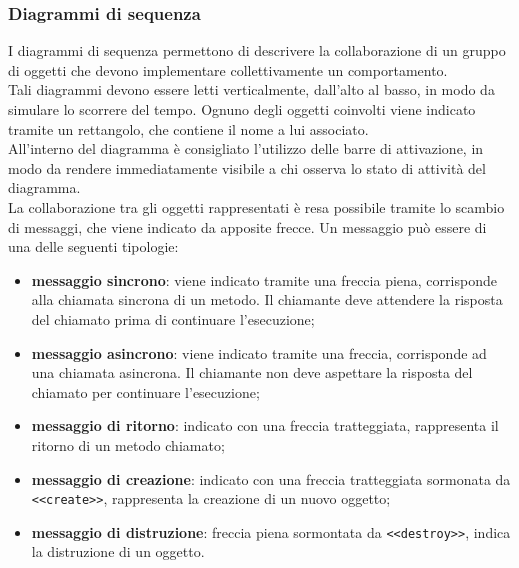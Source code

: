     	\subsubsection*{Diagrammi di sequenza}
    	I diagrammi di sequenza permettono di descrivere la collaborazione di un gruppo di oggetti che devono implementare collettivamente un comportamento. \\
    	Tali diagrammi devono essere letti verticalmente, dall'alto al basso, in modo da simulare lo scorrere del tempo. Ognuno degli oggetti coinvolti viene indicato tramite un rettangolo, che contiene il nome a lui associato. \\  
    	All'interno del diagramma è consigliato l'utilizzo delle barre di attivazione, in modo da rendere immediatamente visibile a chi osserva lo stato di attività del diagramma. 	\\ 
    	La collaborazione tra gli oggetti rappresentati è resa possibile tramite lo scambio di messaggi, che viene indicato da apposite frecce. Un messaggio può essere di una delle seguenti tipologie: 
    	\begin{itemize}
    		\item{\textbf{messaggio sincrono}}: viene indicato tramite una freccia piena, corrisponde alla chiamata sincrona di un metodo. Il chiamante deve attendere la risposta del chiamato prima di continuare l'esecuzione;
    		\item{\textbf{messaggio asincrono}}: viene indicato tramite una freccia, corrisponde ad una chiamata asincrona. Il chiamante non deve aspettare la risposta del chiamato per continuare l'esecuzione;
    		\item{\textbf{messaggio di ritorno}}: indicato con una freccia tratteggiata, rappresenta il ritorno di un metodo chiamato; 
    		\item{\textbf{messaggio di creazione}}: indicato con una freccia tratteggiata sormonata da \texttt{<<create>>}, rappresenta la creazione di un nuovo oggetto;
    		\item{\textbf{messaggio di distruzione}}: freccia piena sormontata da \texttt{<<destroy>>}, indica la distruzione di un oggetto.
    	\end{itemize}
 

